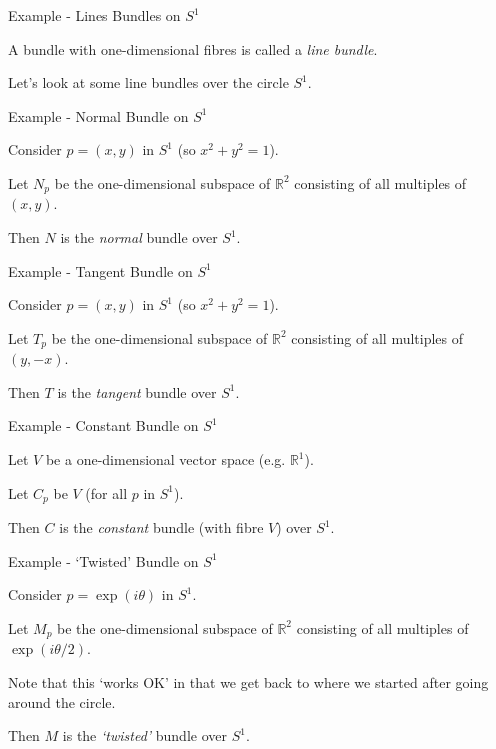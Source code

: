 \documentclass{beamer}
\begin{document}
\begin{frame}{Example - Lines Bundles on $S^1$}

A bundle with one-dimensional fibres is called a \textit{line bundle}.

Let's look at some line bundles over the circle $S^1$.

\end{frame}

\begin{frame}{Example - Normal Bundle on $S^1$}

Consider $p=(x, y)$ in $S^1$ (so $x^2+y^2=1$).

 Let $N_p$ be the one-dimensional subspace of $\mathbb{R}^2$ consisting of all multiples of $(x,y)$.
 
 Then $N$ is the \textit{normal} bundle over $S^1$.

\end{frame}

\begin{frame}{Example - Tangent Bundle on $S^1$}

Consider $p=(x, y)$ in $S^1$ (so $x^2+y^2=1$).

Let $T_p$ be the one-dimensional subspace of $\mathbb{R}^2$ consisting of all multiples of $(y,-x)$.
 
Then $T$ is the \textit{tangent} bundle over $S^1$.

\end{frame}

\begin{frame}{Example - Constant Bundle on $S^1$}

Let $V$ be a one-dimensional vector space (e.g. $\mathbb{R}^1$).

Let $C_p$ be $V$ (for all $p$ in $S^1$).
 
Then $C$ is the \textit{constant} bundle (with fibre $V$) over $S^1$.

\end{frame}


\begin{frame}{Example - `Twisted' Bundle on $S^1$}

Consider $p=\exp{(i \theta)}$ in $S^1$.

Let $M_p$ be the one-dimensional subspace of $\mathbb{R}^2$ consisting of all multiples of $\exp{(i \theta /2)}$.

Note that this `works OK' in that we get back to where we started after going around the circle.
 
Then $M$ is the \textit{`twisted'} bundle over $S^1$.

\end{frame}
\end{document}
